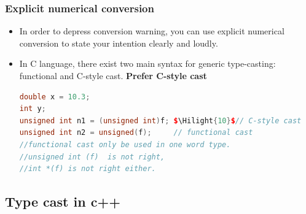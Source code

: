 \documentclass[a4paper,12pt,twoside]{book}
\newcommand{\Hilight}[1]{\makebox[0pt][l]{\color{yellow}\rule[-3pt]{#1em}{11pt}}}
\begin{document}
\subsubsection{Explicit numerical conversion}
\begin{itemize}
\item In order to depress conversion warning, you can use explicit numerical conversion to state your intention clearly and loudly.

\item In C language, there exist two main syntax for generic type-casting: functional and C-style cast.  \textbf{Prefer C-style cast}

\begin{lstlisting}[frame=single, language=c++, mathescape=true]
double x = 10.3;
int y;
unsigned int n1 = (unsigned int)f; $\Hilight{10}$// C-style cast
unsigned int n2 = unsigned(f);     // functional cast
//functional cast only be used in one word type.
//unsigned int (f)  is not right,
//int *(f) is not right either.
\end{lstlisting}

\end{itemize}

\subsection{Type cast in c++}
\end{document}
